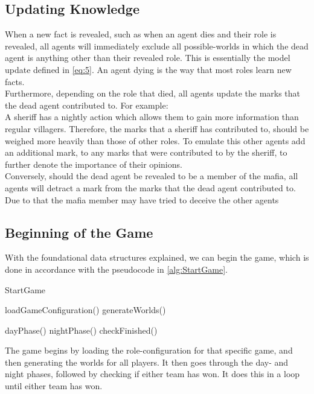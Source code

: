 \subsection{Updating Knowledge}\label{sec:UpdatingKnowledge}
When a new fact is revealed, such as when an agent dies and their role is
revealed, all agents will immediately exclude all possible-worlds in which the
dead agent is anything other than their revealed role. This is essentially the
model update defined in \cref{eq:5}. An agent dying is the way that most roles
learn new facts.\\ Furthermore, depending on the role that died, all agents
update the marks that the dead agent contributed to. For example:\\ A sheriff
has a nightly action which allows them to gain more information than regular
villagers. Therefore, the marks that a sheriff has contributed to, should be
weighed more heavily than those of other roles. To emulate this other agents
add an additional mark, to any marks that were contributed to by the sheriff,
to further denote the importance of their opinions. \\ Conversely, should the
dead agent be revealed to be a member of the mafia, all agents will detract a
mark from the marks that the dead agent contributed to. Due to that the mafia
member may have tried to deceive the other agents

\subsection{Beginning of the Game}\label{sec:beginningOfTheGame}
With the foundational data structures explained, we can begin the game, which
is done in accordance with the pseudocode in \cref{alg:StartGame}.
\begin{algorithm}[H]
	\caption{StartGame}
	\begin{algorithmic}[1]
		\State loadGameConfiguration()
		\State generateWorlds()

		\State dayPhase()
		\State nightPhase()
		\State checkFinished()
		\EndWhile
		\EndFunction
	\end{algorithmic}\label{alg:StartGame}
\end{algorithm}
\setcounter{algorithmcaption}{0}
The game begins by loading the role-configuration for that specific game, and
then generating the worlds for all players. It then goes through the day- and
night phases, followed by checking if either team has won. It does this in a
loop until either team has won.

